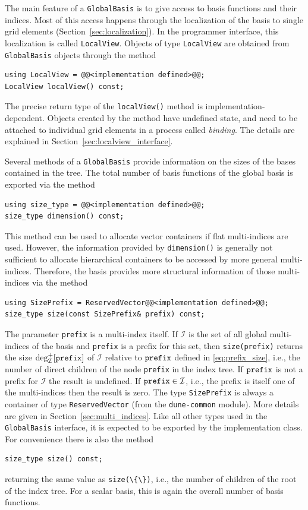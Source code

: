 \documentclass[a4paper,10pt,headings=normal,bibliography=totoc]{scrartcl}
\newcommand{\cpp}[1]{\lstinline[basicstyle=\ttfamily]!#1!}
\newcommand{\dunemodule}[1]{\texttt{#1}}
\begin{document}
The main feature of a \cpp{GlobalBasis} is to give access to basis functions and their indices.
Most of this access happens through the localization of the basis to single grid elements (Section~\ref{sec:localization}).
In the programmer interface, this localization is called \cpp{LocalView}.  Objects of type
\cpp{LocalView} are obtained from \cpp{GlobalBasis} objects through the method
\begin{lstlisting}[style=Interface]
using LocalView = @@<implementation defined>@@;
LocalView localView() const;
\end{lstlisting}
The precise return type of the \cpp{localView()} method is implementation-dependent. Objects
created by the method have undefined state, and need to be attached to individual grid
elements in a process called \emph{binding}.
The details are explained in Section~\ref{sec:localview_interface}.

Several methods of a \cpp{GlobalBasis} provide information on the sizes of the bases
contained in the tree.
The total number of basis functions of the global basis is
exported via the method
\begin{lstlisting}[style=Interface]
using size_type = @@<implementation defined>@@;
size_type dimension() const;
\end{lstlisting}
This method can be used to allocate vector containers if flat multi-indices are used.
However, the information provided by \cpp{dimension()} is generally not
sufficient to allocate hierarchical containers to be
accessed by more general multi-indices.
Therefore, the basis provides more structural
information of those multi-indices via the method
\begin{lstlisting}[style=Interface]
using SizePrefix = ReservedVector@@<implementation defined>@@;
size_type size(const SizePrefix& prefix) const;
\end{lstlisting}
The parameter \cpp{prefix} is a multi-index itself.
If $\mathcal{I}$ is the set of all global multi-indices of the
basis and \cpp{prefix} is a prefix for this set, then
\cpp{size(prefix)} returns the size $\operatorname{deg}^+_{\mathcal{I}}[\text{\cpp{prefix}}]$ of
$\mathcal{I}$ relative to $\text{\cpp{prefix}}$ defined in \eqref{eq:prefix_size},
i.e., the number of direct children of the node \cpp{prefix} in the index tree.
If $\text{\cpp{prefix}}$ is not a prefix for $\mathcal{I}$ the result is undefined.
If $\text{\cpp{prefix}} \in \mathcal{I}$, i.e., the prefix is itself one of the multi-indices
then the result is zero.
The type \cpp{SizePrefix} is always a container of type \cpp{ReservedVector} (from the
\dunemodule{dune-common} module).  More details are given in Section~\ref{sec:multi_indices}.
Like all other types used in the \cpp{GlobalBasis} interface, it is expected to be
exported by the implementation class.
For convenience there is also the method
\begin{lstlisting}[style=Interface]
size_type size() const;
\end{lstlisting}
returning the same value as \cpp{size(\{\})}, i.e., the number of children of the root of
the index tree.
For a scalar basis, this is again the overall number of basis functions.
\end{document}
